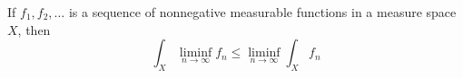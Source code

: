 \documentclass[12pt]{article}
\begin{document}
If $f_1, f_2,\dots$ is a sequence of nonnegative measurable functions in a measure space $X$, then
\[ \int_X \liminf_{n\rightarrow\infty} f_n \leq
\liminf_{n\rightarrow\infty}\int_X f_n \]
\end{document}
